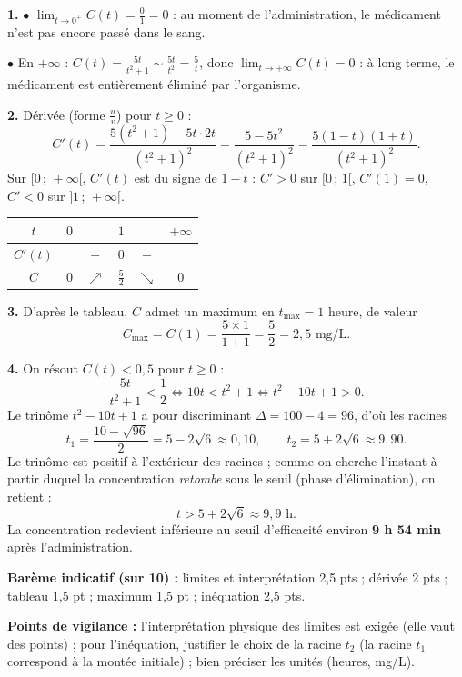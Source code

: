 \documentclass[11pt]{article}
\begin{document}
\begin{corrige}
\textbf{1.} $\bullet$ $\lim_{t \to 0^+} C(t) = \frac{0}{1} = \boxed{0}$ : au moment de l'administration, le médicament n'est pas encore passé dans le sang.

$\bullet$ En $+\infty$ : $C(t) = \frac{5t}{t^2+1} \sim \frac{5t}{t^2} = \frac{5}{t}$, donc $\boxed{\lim_{t \to +\infty} C(t) = 0}$ : à long terme, le médicament est entièrement éliminé par l'organisme.

\textbf{2.} Dérivée (forme $\frac{u}{v}$) pour $t \ge 0$ :
\[ C'(t) = \frac{5(t^2+1) - 5t \cdot 2t}{(t^2+1)^2} = \frac{5 - 5t^2}{(t^2+1)^2} = \frac{5(1 - t)(1 + t)}{(t^2+1)^2}. \]
Sur $[0\,;\,+\infty[$, $C'(t)$ est du signe de $1 - t$ : $C' > 0$ sur $[0\,;\,1[$, $C'(1) = 0$, $C' < 0$ sur $]1\,;\,+\infty[$.

\begin{center}
\begin{tabular}{|c|ccccc|}\hline
$t$ & $0$ & & $1$ & & $+\infty$ \\ \hline
$C'(t)$ & & $+$ & $0$ & $-$ & \\ \hline
$C$ & $0$ & $\nearrow$ & $\frac{5}{2}$ & $\searrow$ & $0$ \\ \hline
\end{tabular}
\end{center}

\textbf{3.} D'après le tableau, $C$ admet un maximum en $t_{\max} = \boxed{1 \text{ heure}}$, de valeur
\[ C_{\max} = C(1) = \frac{5 \times 1}{1 + 1} = \boxed{\frac{5}{2} = 2{,}5 \text{ mg/L}}. \]

\textbf{4.} On résout $C(t) < 0{,}5$ pour $t \ge 0$ :
\[ \frac{5t}{t^2+1} < \frac{1}{2} \iff 10t < t^2 + 1 \iff t^2 - 10t + 1 > 0. \]
Le trinôme $t^2 - 10t + 1$ a pour discriminant $\Delta = 100 - 4 = 96$, d'où les racines
\[ t_1 = \frac{10 - \sqrt{96}}{2} = 5 - 2\sqrt{6} \approx 0{,}10, \qquad t_2 = 5 + 2\sqrt{6} \approx 9{,}90. \]
Le trinôme est positif à l'extérieur des racines ; comme on cherche l'instant à partir duquel la concentration \emph{retombe} sous le seuil (phase d'élimination), on retient :
\[ \boxed{t > 5 + 2\sqrt{6} \approx 9{,}9 \text{ h}}. \]
La concentration redevient inférieure au seuil d'efficacité environ \textbf{9 h 54 min} après l'administration.

\textbf{Barème indicatif (sur 10) :} limites et interprétation 2,5 pts ; dérivée 2 pts ; tableau 1,5 pt ; maximum 1,5 pt ; inéquation 2,5 pts.

\textbf{Points de vigilance :} l'interprétation physique des limites est exigée (elle vaut des points) ; pour l'inéquation, justifier le choix de la racine $t_2$ (la racine $t_1$ correspond à la montée initiale) ; bien préciser les unités (heures, mg/L).
\end{corrige}
\end{document}

